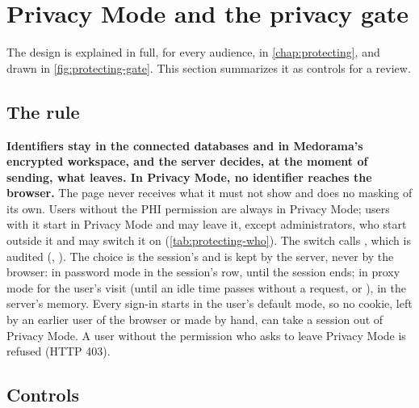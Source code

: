 \section{Privacy Mode and the privacy gate}
\label{sec:security-privacy}

The design is explained in full, for every audience, in \cref{chap:protecting}, and drawn in
\cref{fig:protecting-gate}. This section summarizes it as controls for a review.

\subsection{The rule}
\label{sec:security-rule}

\textbf{Identifiers stay in the connected databases and in Medorama's encrypted workspace, and
the server decides, at the moment of sending, what leaves. In Privacy Mode, no identifier reaches
the browser.} The page never
receives what it must not show and does no masking of its own. Users without the PHI permission
are always in Privacy Mode; users with it start in Privacy Mode and may leave it, except
administrators, who start outside it and may switch it on (\cref{tab:protecting-who}). The switch
calls , which is audited (, ). The choice
is the session's and is kept by the server, never by the browser: in password mode in the
session's row, until the session ends; in proxy mode for the user's visit (until an idle time
passes without a request, or ), in the server's memory. Every sign-in starts in
the user's default mode, so no cookie, left by an earlier user of the browser or made by hand, can
take a session out of Privacy Mode. A user without the permission who asks to leave Privacy Mode
is refused (HTTP 403).

\subsection{Controls}
\label{sec:security-controls}

